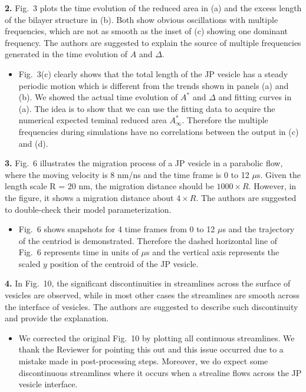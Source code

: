 \documentclass[11pt]{article}
\newcommand{\comment}[1]{{\color{blue} #1}}
\begin{document}
\noindent
\comment{{\bf 2.} Fig.~3 plots the time evolution of the reduced area in (a) and
the excess length of the bilayer structure in (b). Both show obvious
oscillations with multiple frequencies, which are not as smooth as the
inset of (c) showing one dominant frequency. The authors are suggested
to explain the source of multiple frequencies generated in the time
evolution of $A$ and $\Delta$.}
\begin{itemize}
  \item Fig.~3(c) clearly shows that the total length of the JP vesicle has a steady periodic motion 
which is different from the trends shown in panels (a) and (b). We showed the actual time evolution of $A^*$ and $\Delta$ and fitting curves in (a). 
The idea is to show that we can use the fitting data to acquire the numerical expected teminal 
reduced area $A^*_\infty$. Therefore the multiple frequencies during simulations have no correlations between
the output in (c) and (d).
\end{itemize}

\noindent
\comment{{\bf 3.} Fig.~6 illustrates the migration process of a JP vesicle in a
parabolic flow, where the moving velocity is 8 nm/ns and the time frame
is 0 to 12 $\mu$s. Given the length scale R = 20 nm, the migration
distance should be $1000 \times R$. However, in the figure, it shows a
migration distance about $4 \times R$. The authors are suggested to
double-check their model parameterization.}
\begin{itemize}
  \item Fig.~6 shows snapshots for 4 time frames from 0 to 12 $\mu$s and the trajectory of the centriod is demonstrated. Therefore the dashed horizontal line of Fig.~6 represents time in units of $\mu$s and the vertical axis represents the scaled $y$ position of the centroid of the JP vesicle.
\end{itemize}

\noindent
\comment{{\bf 4.} In Fig.~10, the significant discontinuities in streamlines
across the surface of vesicles are observed, while in most other cases
the streamlines are smooth across the interface of vesicles. The authors
are suggested to describe such discontinuity and provide the
explanation.}
\begin{itemize}
  \item We corrected the original Fig.~10 by plotting all continuous streamlines. We thank the Reviewer for pointing this out and this issue occurred due to a mistake made in post-processing
steps. Moreover, we do expect some discontinuous streamlines where it occurs when a strealine flows across the JP vesicle interface.
\end{itemize}
\end{document}
